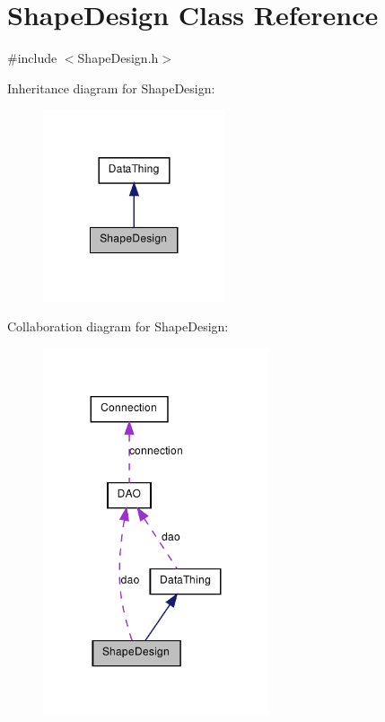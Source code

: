 \hypertarget{class_shape_design}{
\section{ShapeDesign Class Reference}
\label{class_shape_design}
}


{\ttfamily \#include $<$ShapeDesign.h$>$}



Inheritance diagram for ShapeDesign:\nopagebreak
\begin{figure}[H]
\begin{center}
\leavevmode
\includegraphics[width=152pt]{class_shape_design__inherit__graph}
\end{center}
\end{figure}


Collaboration diagram for ShapeDesign:\nopagebreak
\begin{figure}[H]
\begin{center}
\leavevmode
\includegraphics[width=188pt]{class_shape_design__coll__graph}
\end{center}
\end{figure}
